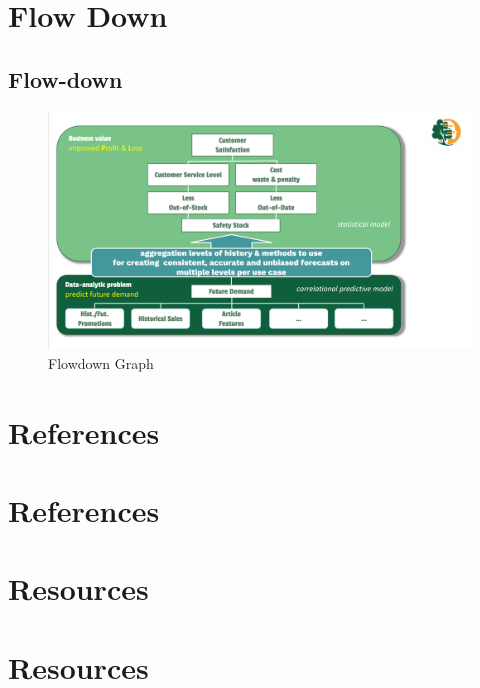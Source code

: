 \documentclass[
  american,
  10,
  a4paper,
]{book}
\theoremstyle{definition}
\theoremstyle{remark}
\begin{document}
\chapter{Flow Down}\label{flow-down}

\section{Flow-down}\label{sec-flowdown}

\begin{figure}[H]

\caption{Flowdown Graph}

{\centering \includegraphics[width=1\linewidth,height=\textheight,keepaspectratio]{nb/../images/flowdown.png}

}

\end{figure}%

\chapter{References}\label{references}

\chapter*{References}\label{references-1}


\label{refs}

\chapter{Resources}\label{resources}

\chapter{Resources}\label{sec-19-resources}
\end{document}

